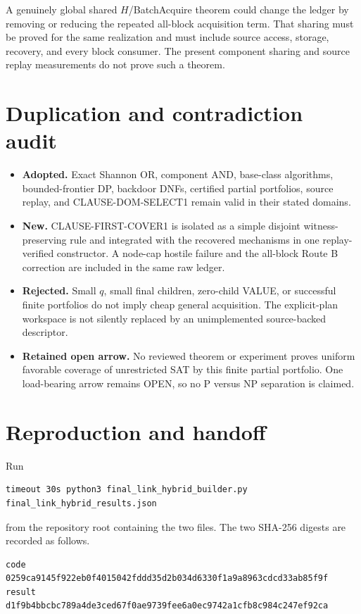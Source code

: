\documentclass[11pt]{article}
\begin{document}
A genuinely global shared $H$/BatchAcquire theorem could change the ledger by
removing or reducing the repeated all-block acquisition term.  That sharing
must be proved for the same realization and must include source access,
storage, recovery, and every block consumer.  The present component sharing
and source replay measurements do not prove such a theorem.

\section{Duplication and contradiction audit}

\begin{itemize}
\item[] \textbf{Adopted.}  Exact Shannon OR, component AND, base-class
algorithms, bounded-frontier DP, backdoor DNFs, certified partial portfolios,
source replay, and CLAUSE-DOM-SELECT1 remain valid in their stated domains.
\item[] \textbf{New.}  CLAUSE-FIRST-COVER1 is isolated as a simple disjoint
witness-preserving rule and integrated with the recovered mechanisms in one
replay-verified constructor.  A node-cap hostile failure and the all-block
Route B correction are included in the same raw ledger.
\item[] \textbf{Rejected.}  Small $q$, small final children, zero-child VALUE,
or successful finite portfolios do not imply cheap general acquisition.
The explicit-plan workspace is not silently replaced by an unimplemented
source-backed descriptor.
\item[] \textbf{Retained open arrow.}  No reviewed theorem or experiment proves
uniform favorable coverage of unrestricted SAT by this finite partial
portfolio.  One load-bearing arrow remains OPEN, so no P versus NP separation
is claimed.
\end{itemize}

\section{Reproduction and handoff}

Run
\begin{verbatim}
timeout 30s python3 final_link_hybrid_builder.py final_link_hybrid_results.json
\end{verbatim}
from the repository root containing the two files.  The two SHA-256 digests
are recorded as follows.
\begin{verbatim}
code   0259ca9145f922eb0f4015042fddd35d2b034d6330f1a9a8963cdcd33ab85f9f
result d1f9b4bbcbc789a4de3ced67f0ae9739fee6a0ec9742a1cfb8c984c247ef92ca
\end{verbatim}
\end{document}
